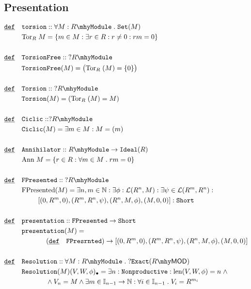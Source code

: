 \documentclass[12pt]{article}
\DeclareMathOperator*{\len}{\mathrm{len}}
\newcommand{\tor}[1]{\mathrm{Tor}_{#1} \;}
\renewcommand{\.}{\; . \;}
\newcommand{\nat}{\mathbb{N}}
\newcommand{\De}{\underline{\mathtt{def}} \quad}
\newcommand{\module}[1]{{#1} \mhy \mathtt{Module}}
\newcommand{\linear}[1]{\mathcal{L}(#1)}
\newcommand{\MOD}[1]{#1 \mhy \mathsf{MOD} }
\newcommand{\set}{\mathtt{Set}}
\begin{document}
\subsection{Presentation}
\begin{align*}
\De &   \mathtt{torsion} :: \forall M : \module{R} \. \set(M)  \\
 &  \tor{R} M  = \{ m \in M : \exists r \in R :r \neq 0 : rm = 0 \}  \\ \\
 \De &   \mathtt{TorsionFree} :: \; ?\module{R} \\
 &  \mathtt{TorsionFree}(M)  = \big(\tor{R}(M) = \{ 0 \} \big)  \\ \\
 \De & \mathtt{Torsion}  :: \; ?\module{R} \\
  & \mathtt{Torsion}(M)  = (\tor{R}(M) =  M) \\ \\
\De & \mathtt{Ciclic} ::  ? \module{R} \\
    & \mathtt{Ciclic}(M) = \exists m \in M : M = (m) \\ \\
\De & \mathtt{Annihilator} :: \module{R} \to \mathtt{Ideal}(R) \\
	& \mathrm{Ann} \; M = \{ r \in R : \forall m \in M \. rm = 0\} \\ \\
\De & \mathtt{FPresented} :: \; ?\module{R}  \\
    & \mathrm{FPresented}(M) = \exists n, m \in \nat : \exists \phi : \linear{ R^n, M}  : \exists \psi \in \linear{R^m, R^n} :  \\ &  \kern 2pc[(0,R^m,0),(R^m,R^n,\psi),(R^n, M, \phi), (M,0,0)] : \mathtt{Short}
    \\ \\
\De & \mathtt{presentation} :: \mathtt{FPresented} \to \mathtt{Short} \\
    & \mathtt{presentation}(M) = \\
    & \kern 3pc(\De \mathtt{FPresrnted}) \to   [(0,R^m,0),(R^m,R^n,\psi),(R^n, M, \phi), (M,0,0)] \\ \\
\De & \mathtt{Resolution} :: \forall M : \module{R} \.  ? \mathtt{Exact}(\MOD{R}) \\
    & \mathtt{Resolution}(M)(V,W,\phi)_{\bullet}  = \exists n  : \mathtt{Nonproductive} : \len (V,W,\phi) = n  \; \wedge  \\
    & \kern 3pc \wedge V_n = M \wedge \exists m \in \mathbb{I}_{n - 1} \to \nat : \forall i \in \mathbb{I}_{n-1} \. V_i = R^{m_i} 
\end{align*}
\end{document}
